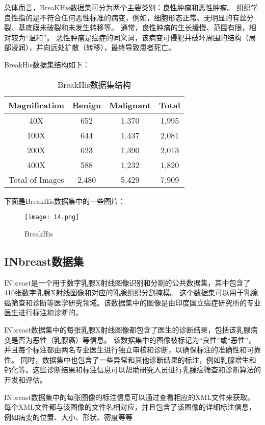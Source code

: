 \documentclass[AutoFakeBold]{LZUThesis}
\begin{document}
总体而言，BreaKHis数据集可分为两个主要类别：良性肿瘤和恶性肿瘤。
组织学良性指的是不符合任何恶性标准的病变，例如，细胞形态正常、无明显的有丝分裂、基底膜未破裂和未发生转移等。
通常，良性肿瘤的生长缓慢、范围有限，相对较为“温和”。
恶性肿瘤是癌症的同义词，该病变可侵犯并破坏周围的结构（局部浸润），并向远处扩散（转移），最终导致患者死亡。

BreakHis数据集结构如下：


\begin{table}[H]
    \centering
    \caption{BreakHis数据集结构}
    \begin{tabular}{|c|c|c|c|} %
    \hline
    Magnification & Benign & Malignant & Total\\
    \hline
    40X & 652 & 1,370 & 1,995\\
    \hline
    100X & 644 & 1,437 & 2,081\\
    \hline
    200X & 623 & 1,390 & 2,013\\
    \hline
    400X & 588 & 1,232 & 1,820\\
    \hline
    Total of Images & 2,480 & 5,429 & 7,909\\
    \hline
    \end{tabular}
    \label{tbl_mos1_nanotube}



\end{table}
下面是BreakHis数据集中的一些图片：
\begin{figure}[H]
    \centering
    \texttt{[image: 14.png]}
    \caption{BreakHis}
    \label{figure}
 \end{figure}


\subsection{INbreast数据集}
INbreast是一个用于数字乳腺X射线图像识别和分割的公共数据集，其中包含了410张数字乳腺X射线图像和对应的乳腺组织分割掩模。
这个数据集可以用于乳腺癌筛查和诊断等医学研究领域。该数据集中的图像是由印度国立癌症研究所的专业医生进行标注和诊断的。

INbreast数据集中的每张乳腺X射线图像都包含了医生的诊断结果，包括该乳腺病变是否为恶性（乳腺癌）等信息。
该数据集中的图像被标记为“良性”或“恶性”，并且每个标注都由两名专业医生进行独立审核和诊断，以确保标注的准确性和可靠性。
同时，数据集中也包含了一些异常和其他诊断结果的标注，例如乳腺增生和钙化等。这些诊断结果和标注信息可以帮助研究人员进行乳腺癌筛查和诊断算法的开发和评估。

INbreast数据集中的每张图像的标注信息可以通过查看相应的XML文件来获取。
每个XML文件都与该图像的文件名相对应，并且包含了该图像的详细标注信息，例如病变的位置、大小、形状、密度等等
\end{document}
